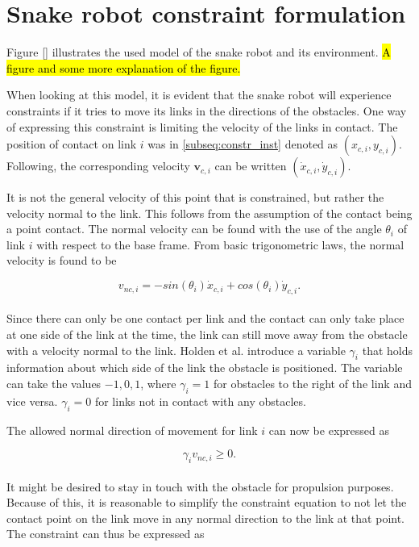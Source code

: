 \section{Snake robot constraint formulation}\label{seq:constraints}

Figure \ref{} illustrates the used model of the snake robot and its environment. \hl{A figure and some more explanation of the figure.}

When looking at this model, it is evident that the snake robot will experience constraints if it tries to move its links in the directions of the obstacles. One way of expressing this constraint is limiting the velocity of the links in contact. The position of contact on link $i$ was in \ref{subseq:constr_inst} denoted as $(x_{c,i}, y_{c,i})$. Following, the corresponding velocity $\mathbf{v}_{c,i}$ can be written $(\dot{x}_{c,i}, \dot{y}_{c,i})$.

It is not the general velocity of this point that is constrained, but rather the velocity normal to the link. This follows from the assumption of the contact being a point contact. The normal velocity can be found with the use of the angle $\theta_i$ of link $i$ with respect to the base frame. From basic trigonometric laws, the normal velocity is found to be

\begin{equation}\label{eq:norm_vel}
    v_{nc,i} = -sin(\theta_i) \dot{x}_{c,i} + cos(\theta_i) \dot{y}_{c,i}.
\end{equation}
\\
Since there can only be one contact per link and the contact can only take place at one side of the link at the time, the link can still move away from the obstacle with a velocity normal to the link. Holden et al. \cite{holden2014optimal} introduce a variable $\gamma_i$ that holds information about which side of the link the obstacle is positioned. The variable can take the values ${-1, 0, 1}$, where $\gamma_i=1$ for obstacles to the right of the link and vice versa. $\gamma_i=0$ for links not in contact with any obstacles.

The allowed normal direction of movement for link $i$ can now be expressed as

\begin{equation}\label{eq:norm_vel2}
    \gamma_i v_{nc,i} \geq 0.
\end{equation}
\\
It might be desired to stay in touch with the obstacle for propulsion purposes. Because of this, it is reasonable to simplify the constraint equation to not let the contact point on the link move in any normal direction to the link at that point. The constraint can thus be expressed as

